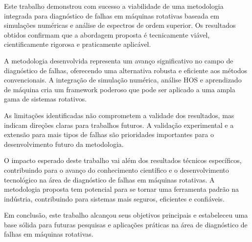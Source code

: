 Este trabalho demonstrou com sucesso a viabilidade de uma metodologia integrada para diagnóstico de falhas em máquinas rotativas baseada em simulações numéricas e análise de espectros de ordem superior. Os resultados obtidos confirmam que a abordagem proposta é tecnicamente viável, cientificamente rigorosa e praticamente aplicável.

A metodologia desenvolvida representa um avanço significativo no campo de diagnóstico de falhas, oferecendo uma alternativa robusta e eficiente aos métodos convencionais. A integração de simulação numérica, análise HOS e aprendizado de máquina cria um framework poderoso que pode ser aplicado a uma ampla gama de sistemas rotativos.

As limitações identificadas não comprometem a validade dos resultados, mas indicam direções claras para trabalhos futuros. A validação experimental e a extensão para mais tipos de falhas são prioridades importantes para o desenvolvimento futuro da metodologia.

O impacto esperado deste trabalho vai além dos resultados técnicos específicos, contribuindo para o avanço do conhecimento científico e o desenvolvimento tecnológico na área de diagnóstico de falhas em máquinas rotativas. A metodologia proposta tem potencial para se tornar uma ferramenta padrão na indústria, contribuindo para sistemas mais seguros, eficientes e confiáveis.

Em conclusão, este trabalho alcançou seus objetivos principais e estabeleceu uma base sólida para futuras pesquisas e aplicações práticas na área de diagnóstico de falhas em máquinas rotativas.
